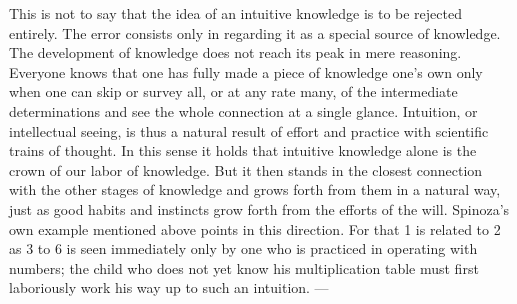 \documentclass[12pt]{book}
\newcommand{\opage}[1]{\marginnote{\footnotesize\textit{[#1]}}}
\begin{document}
This is not to say that the idea of an intuitive knowledge is to be rejected entirely.
The error consists only in regarding it as a special source of knowledge. The
development of knowledge does not reach its peak in \opage{115}mere reasoning. Everyone
knows that one has fully made a piece of knowledge one's own only when one can skip or
survey all, or at any rate many, of the intermediate determinations and see the whole
connection at a single glance. Intuition, or intellectual seeing, is thus a natural
result of effort and practice with scientific trains of thought. In this sense it holds
that intuitive knowledge alone is the crown of our labor of knowledge. But it then
stands in the closest connection with the other stages of knowledge and grows forth from
them in a natural way, just as good habits and instincts grow forth from the efforts of
the will. Spinoza's own example mentioned above points in this direction. For that 1 is
related to 2 as 3 to 6 is seen immediately only by one who is practiced in operating
with numbers; the child who does not yet know his multiplication table must first
laboriously work his way up to such an intuition. ---
\end{document}
